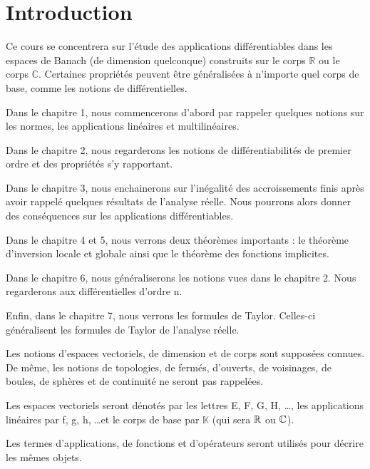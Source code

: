 \chapter*{Introduction}

Ce cours se concentrera sur l'étude des applications différentiables dans les
espaces de Banach (de dimension quelconque) construits sur le corps
$\mathbb{R}$ ou le corps $\mathbb{C}$.  Certaines propriétés peuvent être
généralisées à n'importe quel corps de base, comme les notions de
différentielles.

Dans le chapitre 1, nous commencerons d'abord par rappeler quelques notions sur
les normes, les applications linéaires et multilinéaires.

Dans le chapitre 2, nous regarderons les notions de différentiabilités de
premier ordre et des propriétés s'y rapportant.

Dans le chapitre 3, nous enchainerons sur l'inégalité des accroissements finis après
avoir rappelé quelques résultats de l'analyse réelle. Nous pourrons alors donner
des conséquences sur les applications différentiables.

Dans le chapitre 4 et 5, nous verrons deux théorèmes importants : le théorème
d'inversion locale et globale ainsi que le théorème des fonctions implicites.

Dans le chapitre 6, nous généraliserons les notions vues dans le chapitre 2.
Nous regarderons aux différentielles d'ordre n.

Enfin, dans le chapitre 7, nous verrons les formules de Taylor. Celles-ci
généralisent les formules de Taylor de l'analyse réelle.

Les notions d'espaces vectoriels, de dimension et de corps sont supposées
connues. De même, les notions de topologies, de fermés, d'ouverts, de
voisinages, de boules, de sphères et de continuité ne seront pas rappelées.

Les espaces vectoriels seront dénotés par les lettres E, F, G, H, \ldots, les
applications linéaires par f, g, h, \ldots et le corps de base par $\mathbb{K}$
(qui sera $\mathbb{R}$ ou $\mathbb{C}$).

Les termes d'applications, de fonctions et d'opérateurs seront utilisés pour
décrire les mêmes objets.

